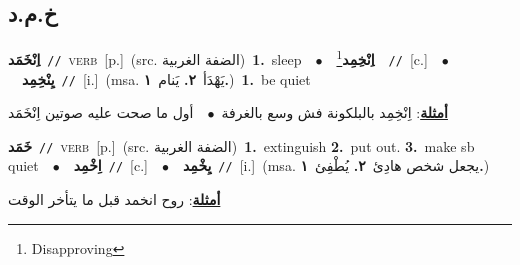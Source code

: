 \documentclass[10pt,a4paper,twoside]{article} %
\begin{document}
\begin{multicols}{2}
\vspace{-3mm}
\subsection*{\color{blue}\foreignlanguage{arabic}{خ.م.د}\color{blue}{}} 

{\setlength\topsep{0pt}\textbf{\foreignlanguage{arabic}{اِنْخَمَد}}\ {\color{gray}\texttt{//}\color{black}}\ \textsc{verb}\ [p.]\ (src. \color{gray}\foreignlanguage{arabic}{الضفة الغربية}\color{black})\ \textbf{1.}~sleep\ \ $\bullet$\ \ \setlength\topsep{0pt}\textbf{\foreignlanguage{arabic}{اِنْخِمِد}}\footnote{Disapproving}\ \ {\color{gray}\texttt{//}\color{black}}\ [c.]\ \ $\bullet$\ \ \setlength\topsep{0pt}\textbf{\foreignlanguage{arabic}{يِنْخِمِد}}\ {\color{gray}\texttt{//}\color{black}}\ [i.]\ \color{gray}(msa. \foreignlanguage{arabic}{يَهْدَأ}~\foreignlanguage{arabic}{\textbf{٢.}}  \foreignlanguage{arabic}{يَنام}~\foreignlanguage{arabic}{\textbf{١.}})\color{black}\ \textbf{1.}~be quiet\  \begin{flushright}\color{gray}\foreignlanguage{arabic}{\textbf{\underline{\foreignlanguage{arabic}{أمثلة}}}: اِنْخِمِد بالبلكونة فش وسع بالغرفة\ $\bullet$\ \  أول ما صحت عليه صوتين اِنْخَمَد}\end{flushright}\color{black}} \vspace{2mm}

{\setlength\topsep{0pt}\textbf{\foreignlanguage{arabic}{خَمَد}}\ {\color{gray}\texttt{//}\color{black}}\ \textsc{verb}\ [p.]\ (src. \color{gray}\foreignlanguage{arabic}{الضفة الغربية}\color{black})\ \textbf{1.}~extinguish  \textbf{2.}~put out.  \textbf{3.}~make sb quiet\ \ $\bullet$\ \ \setlength\topsep{0pt}\textbf{\foreignlanguage{arabic}{اِخْمِد}}\ {\color{gray}\texttt{//}\color{black}}\ [c.]\ \ $\bullet$\ \ \setlength\topsep{0pt}\textbf{\foreignlanguage{arabic}{يِخْمِد}}\ {\color{gray}\texttt{//}\color{black}}\ [i.]\ \color{gray}(msa. \foreignlanguage{arabic}{يجعل شخص هادِئ}~\foreignlanguage{arabic}{\textbf{٢.}}  \foreignlanguage{arabic}{يُطْفِئ}~\foreignlanguage{arabic}{\textbf{١.}})\color{black}\  \begin{flushright}\color{gray}\foreignlanguage{arabic}{\textbf{\underline{\foreignlanguage{arabic}{أمثلة}}}: روح انخمد قبل ما يتأخر الوقت}\end{flushright}\color{black}} \vspace{2mm}


\end{multicols}
\end{document}
